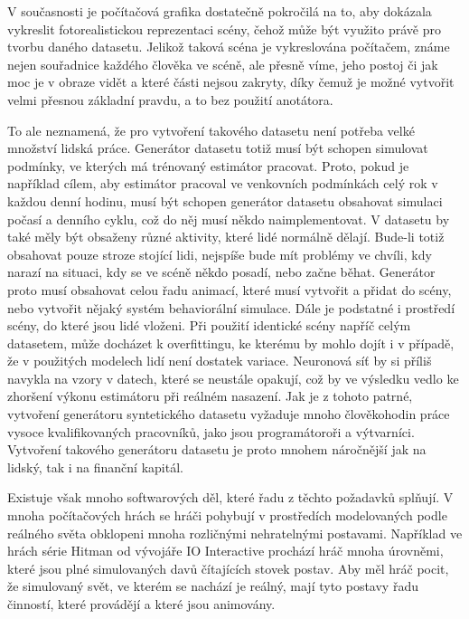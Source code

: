 V současnosti je počítačová grafika dostatečně pokročilá na to, aby dokázala vykreslit fotorealistickou reprezentaci scény, čehož může být využito právě pro tvorbu daného datasetu.
Jelikož taková scéna je vykreslována počítačem, známe nejen souřadnice každého člověka ve scéně, ale přesně víme, jeho postoj či jak moc je v obraze vidět a které části nejsou zakryty, díky čemuž je možné vytvořit velmi přesnou základní pravdu, a to bez použití anotátora.

To ale neznamená, že pro vytvoření takového datasetu není potřeba velké množství lidská práce.
Generátor datasetu totiž musí být schopen simulovat podmínky, ve kterých má trénovaný estimátor pracovat.
Proto, pokud je například cílem, aby estimátor pracoval ve venkovních podmínkách celý rok v každou denní hodinu, musí být schopen generátor datasetu obsahovat simulaci počasí a denního cyklu, což do něj musí někdo naimplementovat.
V datasetu by také měly být obsaženy různé aktivity, které lidé normálně dělají.
Bude-li totiž obsahovat pouze stroze stojící lidi, nejspíše bude mít problémy ve chvíli, kdy narazí na situaci, kdy se ve scéně někdo posadí, nebo začne běhat.
Generátor proto musí obsahovat celou řadu animací, které musí vytvořit a přidat do scény, nebo vytvořit nějaký systém behaviorální simulace.
Dále je podstatné i prostředí scény, do které jsou lidé vloženi.
Při použití identické scény napříč celým datasetem, může docházet k overfittingu, ke kterému by mohlo dojít i v případě, že v použitých modelech lidí není dostatek variace.
Neuronová síť by si příliš navykla na vzory v datech, které se neustále opakují, což by ve výsledku vedlo ke zhoršení výkonu estimátoru při reálném nasazení.
Jak je z tohoto patrné, vytvoření generátoru syntetického datasetu vyžaduje mnoho člověkohodin práce vysoce kvalifikovaných pracovníků, jako jsou programátoroři a výtvarníci.
Vytvoření takového generátoru datasetu je proto mnohem náročnější jak na lidský, tak i na finanční kapitál.

Existuje však mnoho softwarových děl, které řadu z těchto požadavků splňují.
V mnoha počítačových hrách se hráči pohybují v prostředích modelovaných podle reálného světa obklopeni mnoha rozličnými nehratelnými postavami.
Například ve hrách série Hitman \cite{hitman} od vývojáře IO Interactive prochází hráč mnoha úrovněmi, které jsou plné simulovaných davů čítajících stovek postav.
Aby měl hráč pocit, že simulovaný svět, ve kterém se nachází je reálný, mají tyto postavy řadu činností, které provádějí a které jsou animovány.

